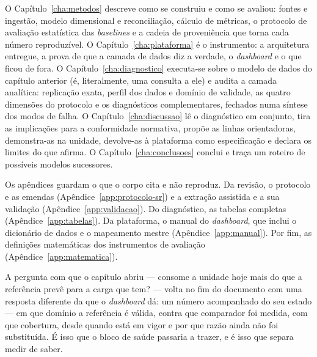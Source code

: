 O Capítulo~\ref{cha:metodos} descreve como se construiu e como se
avaliou: fontes e ingestão, modelo dimensional e reconciliação, cálculo
de métricas, o protocolo de avaliação estatística das \emph{baselines}
e a cadeia de proveniência que torna cada número reproduzível. O
Capítulo~\ref{cha:plataforma} é o instrumento: a arquitetura entregue,
a prova de que a camada de dados diz a verdade, o \emph{dashboard} e o
que ficou de fora. O Capítulo~\ref{cha:diagnostico} executa-se sobre o
modelo de dados do capítulo anterior (é, literalmente, uma consulta a
ele) e audita a camada analítica: replicação exata, perfil dos dados e
domínio de validade, as quatro dimensões do protocolo e os diagnósticos
complementares, fechados numa síntese dos modos de falha. O
Capítulo~\ref{cha:discussao} lê o diagnóstico em conjunto, tira as
implicações para a conformidade normativa, propõe as linhas
orientadoras, demonstra-as na unidade, devolve-as à plataforma como
especificação e declara os limites do que afirma. O
Capítulo~\ref{cha:conclusoes} conclui e traça um roteiro de possíveis modelos
sucessores.


Os apêndices guardam o que o corpo cita e não reproduz. Da revisão, o
protocolo e as emendas (Apêndice~\ref{app:protocolo-sr}) e a extração
assistida e a sua validação (Apêndice~\ref{app:validacao}). Do diagnóstico,
as tabelas completas (Apêndice~\ref{app:tabelas}). Da plataforma, o manual
do \emph{dashboard}, que inclui o dicionário de dados e o mapeamento mestre
(Apêndice~\ref{app:manual}). Por fim, as definições matemáticas dos
instrumentos de avaliação (Apêndice~\ref{app:matematica}).

A pergunta com que o capítulo abriu --- consome a unidade hoje mais do
que a referência prevê para a carga que tem? --- volta no fim do
documento com uma resposta diferente da que o \emph{dashboard} dá: um
número acompanhado do seu estado --- em que domínio a referência é
válida, contra que comparador foi medida, com que cobertura, desde
quando está em vigor e por que razão ainda não foi substituída. É isso que o bloco de saúde passaria a trazer, e é isso que
separa medir de saber.
